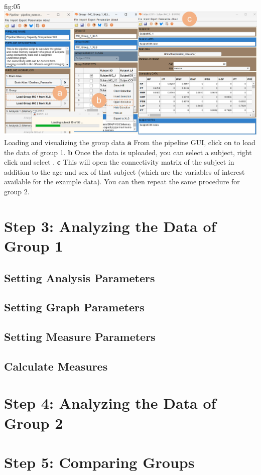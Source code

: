 \documentclass[justified]{tufte-handout}
\begin{document}
{fig:05}
{
	\includegraphics{fig05.jpg}
}
{Loading and visualizing the group data}
{
	{\bf a} From the pipeline GUI, click on  to load the data of group 1.
	{\bf b} Once the data is uploaded, you can select a subject, right click and select .
	{\bf c} This will open the connectivity matrix of the subject in addition to the age and sex of that subject (which are the variables of interest available for the example data).
	You can then repeat the same procedure for group 2.
}



\clearpage
\section{Step 3: Analyzing the Data of Group 1}


\subsection{Setting Analysis Parameters}



\subsection{Setting Graph Parameters}


\subsection{Setting Measure Parameters}


\clearpage
\subsection{Calculate Measures}



\section{Step 4: Analyzing the Data of Group 2}



\clearpage
\section{Step 5: Comparing Groups}
\end{document}
